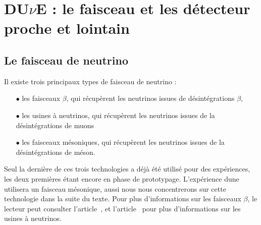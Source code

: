         
        
  \section{\texorpdfstring{DU$\nu$E}{DUNE} : le faisceau et les détecteur proche et lointain}\label{sec::faisceau_et_det}

    \subsection{Le faisceau de neutrino}\label{sec::faisceau}

      Il existe trois principaux types de faisceau de neutrino :
      \begin{itemize}
        \item[$\bullet$] les faisceaux $\beta$, qui récupèrent les neutrinos issues de désintégrations $\beta$,
        \item[$\bullet$] les usines à neutrinos, qui récupèrent les neutrinos issues de la désintégrations de muons
        \item[$\bullet$] les faisceaux mésoniques, qui récupèrent les neutrinos issues de la désintégrations de méson.
      \end{itemize}
      Seul la dernière de ces trois technologies a déjà été utilisé pour des expériences, les deux premières étant encore en phase de prototypage. L'expérience \gls{dune} utilisera un faisceau mésonique, aussi nous nous concentrerons sur cette technologie dans la suite du texte. Pour plus d'informations sur les faisceaux $\beta$, le lecteur peut consulter l'article~\cite{Wildner2012}, et l'article~\cite{Bogomilov2014} pour plus d'informations sur les usines à neutrinos.
        
